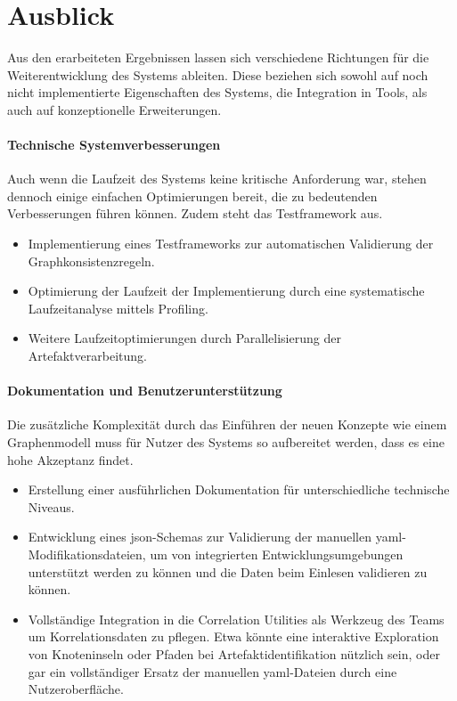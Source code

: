 \section{Ausblick}\label{sec:schluss-ausblick}

Aus den erarbeiteten Ergebnissen lassen sich verschiedene Richtungen für die Weiterentwicklung des Systems ableiten.
Diese beziehen sich sowohl auf noch nicht implementierte Eigenschaften des Systems, die Integration in Tools, als auch auf konzeptionelle Erweiterungen.

\paragraph{Technische Systemverbesserungen}

Auch wenn die Laufzeit des Systems keine kritische Anforderung war, stehen dennoch einige einfachen Optimierungen bereit, die zu bedeutenden Verbesserungen führen können.
Zudem steht das Testframework aus.

\begin{itemize}
    \itemsep0em
    \item Implementierung eines Testframeworks zur automatischen Validierung der Graphkonsistenzregeln.
    \item Optimierung der Laufzeit der Implementierung durch eine systematische Laufzeitanalyse mittels Profiling.
    \item Weitere Laufzeitoptimierungen durch Parallelisierung der Artefaktverarbeitung.
\end{itemize}

\paragraph{Dokumentation und Benutzerunterstützung}

Die zusätzliche Komplexität durch das Einführen der neuen Konzepte wie einem Graphenmodell muss für Nutzer des Systems so aufbereitet werden, dass es eine hohe Akzeptanz findet.

\begin{itemize}
    \itemsep0em
    \item Erstellung einer ausführlichen Dokumentation für unterschiedliche technische Niveaus.
    \item Entwicklung eines \acrshort{json}-Schemas zur Validierung der manuellen \acrshort{yaml}-Modifikationsdateien, um von integrierten Entwicklungsumgebungen unterstützt werden zu können und die Daten beim Einlesen validieren zu können.
    \item Vollständige Integration in die Correlation Utilities als Werkzeug des Teams um Korrelationsdaten zu pflegen.
    Etwa könnte eine interaktive Exploration von Knoteninseln oder Pfaden bei Artefaktidentifikation nützlich sein, oder gar ein vollständiger Ersatz der manuellen \acrshort{yaml}-Dateien durch eine Nutzeroberfläche.
\end{itemize}


